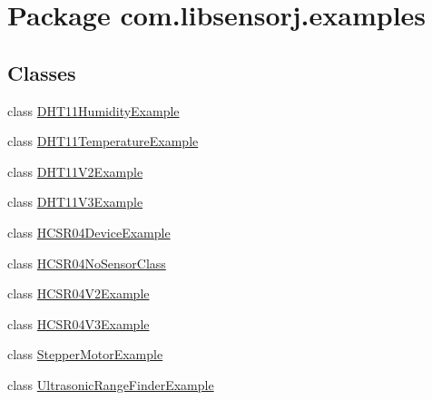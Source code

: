 \hypertarget{namespacecom_1_1libsensorj_1_1examples}{}\section{Package com.\+libsensorj.\+examples}
\label{namespacecom_1_1libsensorj_1_1examples}
\subsection*{Classes}
\begin{DoxyCompactItemize}
\item 
class \hyperlink{classcom_1_1libsensorj_1_1examples_1_1DHT11HumidityExample}{D\+H\+T11\+Humidity\+Example}
\item 
class \hyperlink{classcom_1_1libsensorj_1_1examples_1_1DHT11TemperatureExample}{D\+H\+T11\+Temperature\+Example}
\item 
class \hyperlink{classcom_1_1libsensorj_1_1examples_1_1DHT11V2Example}{D\+H\+T11\+V2\+Example}
\item 
class \hyperlink{classcom_1_1libsensorj_1_1examples_1_1DHT11V3Example}{D\+H\+T11\+V3\+Example}
\item 
class \hyperlink{classcom_1_1libsensorj_1_1examples_1_1HCSR04DeviceExample}{H\+C\+S\+R04\+Device\+Example}
\item 
class \hyperlink{classcom_1_1libsensorj_1_1examples_1_1HCSR04NoSensorClass}{H\+C\+S\+R04\+No\+Sensor\+Class}
\item 
class \hyperlink{classcom_1_1libsensorj_1_1examples_1_1HCSR04V2Example}{H\+C\+S\+R04\+V2\+Example}
\item 
class \hyperlink{classcom_1_1libsensorj_1_1examples_1_1HCSR04V3Example}{H\+C\+S\+R04\+V3\+Example}
\item 
class \hyperlink{classcom_1_1libsensorj_1_1examples_1_1StepperMotorExample}{Stepper\+Motor\+Example}
\item 
class \hyperlink{classcom_1_1libsensorj_1_1examples_1_1UltrasonicRangeFinderExample}{Ultrasonic\+Range\+Finder\+Example}
\end{DoxyCompactItemize}
